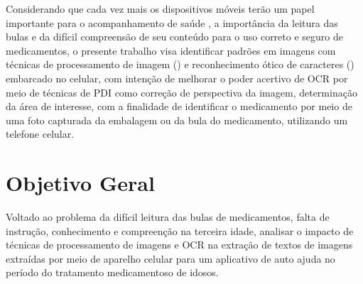 
Considerando que cada vez mais os dispositivos móveis terão um papel importante para o acompanhamento de saúde \cite{ESTADAOCELULAR}, a importância da leitura das bulas e da difícil compreensão de seu conteúdo para o uso correto e seguro de medicamentos, o presente trabalho visa identificar padrões em imagens com técnicas de processamento de imagem () e reconhecimento ótico de caracteres () embarcado no celular, com intenção de melhorar o poder acertivo de OCR por meio de técnicas de PDI como correção de perspectiva da imagem, determinação da área de interesse, com a finalidade de identificar o medicamento por meio de uma foto capturada da embalagem ou da bula do medicamento, utilizando um telefone celular.



\section{Objetivo Geral}

Voltado ao problema da difícil leitura das bulas de medicamentos, falta de instrução, conhecimento e compreenção na terceira idade, analisar o impacto de técnicas de processamento de imagens e OCR na extração de textos de imagens extraídas por meio de aparelho celular para um aplicativo de auto ajuda no período do tratamento medicamentoso de idosos.





